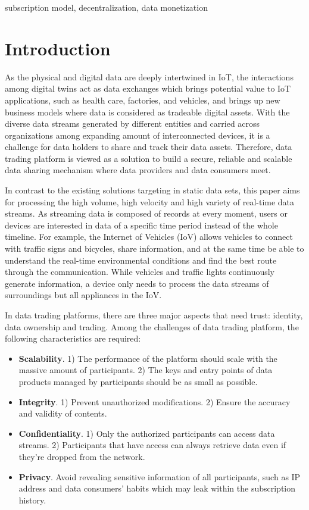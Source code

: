 \documentclass[conference]{IEEEtran}
\begin{document}
\begin{IEEEkeywords}
subscription model, decentralization, data monetization
\end{IEEEkeywords}

\section{Introduction}
As the physical and digital data are deeply intertwined in IoT, the interactions among digital twins act as data exchanges\cite{digitaltwin} which brings potential value to IoT applications, such as health care\cite{healthCare}, factories, and vehicles\cite{AutonomousDriving}, and brings up new business models where data is considered as tradeable digital assets. With the diverse data streams generated by different entities and carried across organizations among expanding amount of interconnected devices, it is a challenge for data holders to share and track their data assets. Therefore, data trading platform is viewed as a solution to build a secure, reliable and scalable data sharing mechanism where data providers and data consumers meet.

In contrast to the existing solutions targeting in static data sets\cite{DIaas, MARSA}, this paper aims for processing the high volume, high velocity and high variety of real-time data streams\cite{BigData}. As streaming data is composed of records at every moment, users or devices are interested in data of a specific time period instead of the whole timeline. For example, the Internet of Vehicles (IoV) allows vehicles to connect with traffic signs and bicycles, share information, and at the same time be able to understand the real-time environmental conditions and find the best route through the communication. While vehicles and traffic lights continuously generate information, a device only needs to process the data streams of surroundings but all appliances in the IoV.

In data trading platforms, there are three major aspects that need trust: identity, data ownership and trading.
Among the challenges of data trading platform\cite{BigDataMarket}, the following characteristics are required:
\begin{itemize}
	\item \textbf{Scalability}. 
1) The performance of the platform should scale with the massive amount of participants. 2) The keys and entry points of data products managed by participants should be as small as possible. 
	\item \textbf{Integrity}. 1) Prevent unauthorized modifications. 2) Ensure the accuracy and validity of contents.	
	\item \textbf{Confidentiality}. 
1) Only the authorized participants can access data streams. 2) Participants that have access can always retrieve data even if they're dropped from the network.	
	\item \textbf{Privacy}. Avoid revealing sensitive information of all participants, such as IP address and data consumers' habits which may leak within the subscription history.
\end{itemize}
\end{document}
